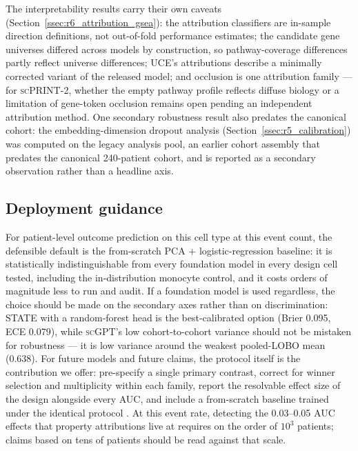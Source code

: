 \documentclass[11pt,a4paper]{article}
\newcommand{\model}[1]{\textsc{#1}}
\begin{document}
The interpretability results carry their own caveats
(Section~\ref{ssec:r6_attribution_gsea}): the attribution classifiers are
in-sample direction definitions, not out-of-fold performance estimates; the
candidate gene universes differed across models by construction, so
pathway-coverage differences partly reflect universe differences;
\model{UCE}'s attributions describe a minimally corrected variant of the
released model; and occlusion is one attribution family --- for
\model{scPRINT-2}, whether the empty pathway profile reflects diffuse biology
or a limitation of gene-token occlusion remains open pending an independent
attribution method. One secondary robustness result also predates the
canonical cohort: the embedding-dimension dropout analysis
(Section~\ref{ssec:r5_calibration}) was computed on the legacy analysis pool,
an earlier cohort assembly that predates the canonical 240-patient cohort,
and is reported as a secondary observation rather than a headline axis.

\subsection{Deployment guidance}
\label{ssec:discussion_guidance}

For patient-level outcome prediction on this cell type at this event count,
the defensible default is the from-scratch PCA + logistic-regression
baseline: it is statistically indistinguishable from every foundation model
in every design cell tested, including the in-distribution monocyte control,
and it costs orders of magnitude less to run and audit. If a foundation model
is used regardless, the choice should be made on the secondary axes rather
than on discrimination: \model{STATE} with a random-forest head is the
best-calibrated option (Brier 0.095, ECE 0.079), while \model{scGPT}'s low
cohort-to-cohort variance should not be mistaken for robustness --- it is
low variance around the weakest pooled-LOBO mean (0.638). For future models
and future claims, the protocol itself is the contribution we offer:
pre-specify a single primary contrast, correct for winner selection and
multiplicity within each family, report the resolvable effect size of the
design alongside every AUC, and include a from-scratch baseline trained under
the identical protocol \citep{collins2024tripodai}. At this event rate, detecting the 0.03--0.05 AUC
effects that property attributions live at requires on the order of $10^3$
patients; claims based on tens of patients should be read against that scale.
\end{document}
